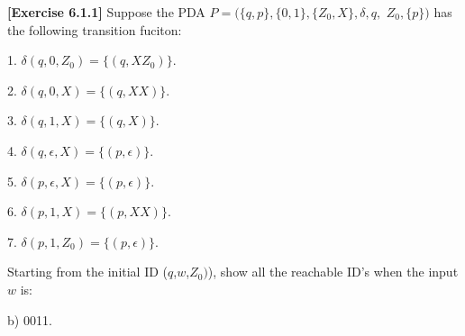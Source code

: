 \textbf{[Exercise 6.1.1]} Suppose the PDA 
$P=(\{q,p\},\{0,1\},\{Z_0,X\},\delta,q,$ $Z_0,\{p\})$ has the following transition
fuciton:

1. $\delta(q,0,Z_0) = \{(q,XZ_0)\}$.

2. $\delta(q,0,X) = \{(q,XX)\}$.

3. $\delta(q,1,X) = \{(q,X)\}$.

4. $\delta(q,\epsilon,X) = \{(p,\epsilon)\}$.

5. $\delta(p,\epsilon,X) = \{(p,\epsilon)\}$.

6. $\delta(p,1,X) = \{(p,XX)\}$.

7. $\delta(p,1,Z_0) = \{(p,\epsilon)\}$.

Starting from the initial ID ($q$,$w$,$Z_0)$), show all the reachable ID's when the 
input $w$ is:

b) 0011.
